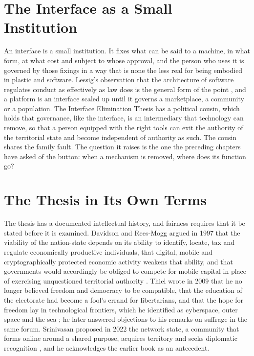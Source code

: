 \documentclass[11pt,twoside,openany]{book}
\theoremstyle{definition}
\theoremstyle{remark}
\begin{document}
\section{The Interface as a Small Institution}

An interface is a small institution. It fixes what can be said to a machine, in what form, at what cost and subject to whose approval, and the person who uses it is governed by those fixings in a way that is none the less real for being embodied in plastic and software. Lessig's observation that the architecture of software regulates conduct as effectively as law does is the general form of the point \cite{lessig1999}, and a platform is an interface scaled up until it governs a marketplace, a community or a population. The Interface Elimination Thesis has a political cousin, which holds that governance, like the interface, is an intermediary that technology can remove, so that a person equipped with the right tools can exit the authority of the territorial state and become independent of authority as such. The cousin shares the family fault. The question it raises is the one the preceding chapters have asked of the button: when a mechanism is removed, where does its function go?

\section{The Thesis in Its Own Terms}

The thesis has a documented intellectual history, and fairness requires that it be stated before it is examined. Davidson and Rees-Mogg argued in 1997 that the viability of the nation-state depends on its ability to identify, locate, tax and regulate economically productive individuals, that digital, mobile and cryptographically protected economic activity weakens that ability, and that governments would accordingly be obliged to compete for mobile capital in place of exercising unquestioned territorial authority \cite{davidson1997}. Thiel wrote in 2009 that he no longer believed freedom and democracy to be compatible, that the education of the electorate had become a fool's errand for libertarians, and that the hope for freedom lay in technological frontiers, which he identified as cyberspace, outer space and the sea \cite{thiel2009}; he later answered objections to his remarks on suffrage in the same forum. Srinivasan proposed in 2022 the network state, a community that forms online around a shared purpose, acquires territory and seeks diplomatic recognition \cite{srinivasan2022}, and he acknowledges the earlier book as an antecedent.
\end{document}
